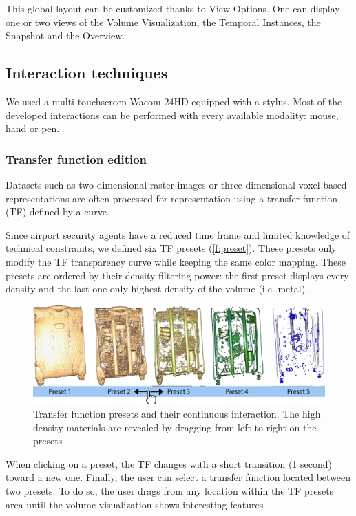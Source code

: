 This global layout can be customized thanks to View Options. One can display one or two views of the Volume Visualization, the Temporal Instances, the Snapshot and the Overview.

\subsection{Interaction techniques}

We used a multi touchscreen Wacom 24HD equipped with a stylus. Most of the developed interactions can be performed with every available modality: mouse, hand or pen.
\subsubsection{ Transfer function edition}	
Datasets such as two dimensional raster images or three dimensional voxel based representations are often processed for representation using a transfer function (TF) defined by a curve. 

Since airport security agents have a reduced time frame and limited knowledge of technical constraints, we defined six TF presets (\autoref{f:preset}). These presets only modify the TF transparency curve while keeping the same color mapping. These presets are ordered by their density filtering power: the first preset displays every density and the last one only highest density of the volume (i.e. metal). 

\begin{figure}
   \centering   
	\includegraphics[width=15cm]{Figures/preset.png}
	\caption{ Transfer function presets and their continuous interaction. The high density materials are revealed by dragging from left to right on the presets }
	\label{f:preset}
\end{figure}
When clicking on a preset, the TF changes with a short transition (1 second) toward a new one. 
Finally, the user can select a transfer function located between two presets. To do so, the user drags from any location within the TF presets area until the volume visualization shows interesting features 

